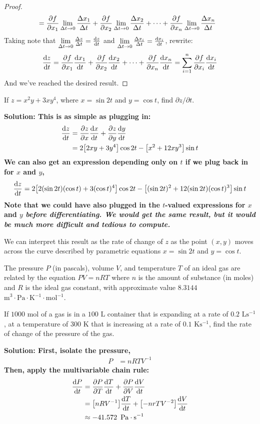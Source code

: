 \begin{proof}
\begin{align*}
        &= \pdv{f}{x_1}\lim_{\Delta t\to 0}\frac{\Delta x_1}{\Delta t} + \pdv{f}{x_2}\lim_{\Delta t\to 0}\frac{\Delta x_2}{\Delta t} + \dots + \pdv{f}{x_n}\lim_{\Delta t \to 0}\frac{\Delta x_n}{\Delta t}
    \end{align*}
    Taking note that \(\lim\limits_{\Delta t \to 0}\frac{\Delta z}{\Delta t} = \dv{z}{t}\) and \(\lim\limits_{\Delta t\to 0}\frac{\Delta x_i}{\Delta t} = \dv{x_i}{t}\), rewrite:
    \[ \dv{z}{t} = \pdv{f}{x_1}\dv{x_1}{t} + \pdv{f}{x_2}\dv{x_2}{t}+\dots+\pdv{f}{x_n}\dv{x_n}{t} = \sum_{i=1}^n\pdv{f}{x_i}\dv{x_i}{t} \]
    And we've reached the desired result.    
\end{proof}
\begin{example}
    If \(z=x^2y+3xy^4\), where \(x=\sin 2t\) and \(y=\cos t\), find \(\partial z/\partial t\). \par\bf{Solution: }This is as simple as plugging in:
    \begin{align*}
        \dv{z}{t} &= \pdv{z}{x}\dv{x}{t} + \pdv{z}{y}\dv{y}{t} \\
        &= 2\bqty{2xy + 3y^4}\cos 2t - \bqty{x^2+12xy^3}\sin t
    \end{align*}
    We can also get an expression depending only on \(t\) if we plug back in for \(x\) and \(y\),
    \[ \dv{z}{t} = 2\bqty{2(\sin 2t)(\cos t) + 3(\cos t)^4}\cos 2t - \bqty{(\sin 2t)^2 + 12(\sin 2t)(\cos t)^3}\sin t\]
    Note that we could have also plugged in the \(t\)-valued expressions for \(x\) and \(y\) \it{before} differentiating. We would get the same result, but it would be much more difficult and tedious to compute.\par
    We can interpret this result as the rate of change of \(z\) as the point \((x,y)\) moves across the curve described by parametric equations \(x=\sin 2t\) and \(y=\cos t\).
\end{example}
\begin{example}
    The pressure \(P\) (in pascals), volume \(V\), and temperature \(T\) of an ideal gas are related by the equation \(PV=nRT\) where \(n\) is the amount of substance (in moles) and \(R\) is the ideal gas constant, with approximate value \( 8.3144\) \(\unit{\metre^3\cdot \pascal\cdot \kelvin^{-1}\cdot \mol^{-1}}\). \par
    If \( 1000 \) \(\unit{\mol}\) of a gas is in a \(100\) \(\unit{\liter} \) container that is expanding at a rate of \(0.2\) \(\unit{\liter \second^{-1}}\), at a temperature of \(300\) \(\unit{\kelvin}\) that is increasing at a rate of \(0.1\) \(\unit{\kelvin\second^{-1}}\), find the rate of change of the pressure of the gas. \par\bf{Solution: }First, isolate the pressure,
    \begin{align*}
    P &= nRTV^{-1}
    \end{align*}
    Then, apply the multivariable chain rule:
    \begin{align*}
    \dv{P}{t} &= \pdv{P}{T}\dv{T}{t}+\pdv{P}{V}\dv{V}{t} \\
    &= \bqty{nRV^{-1}}\dv{T}{t} +\bqty{-nrTV^{-2}}\dv{V}{t} \\
    &\approx -41.572\enskip\unit{\pascal\cdot \second^{-1}}
    \end{align*}
\end{example}
